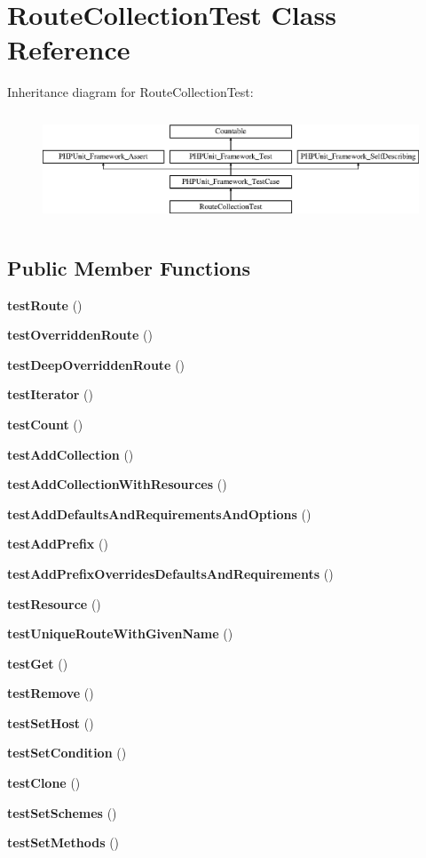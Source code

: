 \section{Route\+Collection\+Test Class Reference}
\label{class_symfony_1_1_component_1_1_routing_1_1_tests_1_1_route_collection_test}
Inheritance diagram for Route\+Collection\+Test\+:\begin{figure}[H]
\begin{center}
\leavevmode
\includegraphics[height=3.303835cm]{class_symfony_1_1_component_1_1_routing_1_1_tests_1_1_route_collection_test}
\end{center}
\end{figure}
\subsection*{Public Member Functions}
\begin{DoxyCompactItemize}
\item 
{\bf test\+Route} ()
\item 
{\bf test\+Overridden\+Route} ()
\item 
{\bf test\+Deep\+Overridden\+Route} ()
\item 
{\bf test\+Iterator} ()
\item 
{\bf test\+Count} ()
\item 
{\bf test\+Add\+Collection} ()
\item 
{\bf test\+Add\+Collection\+With\+Resources} ()
\item 
{\bf test\+Add\+Defaults\+And\+Requirements\+And\+Options} ()
\item 
{\bf test\+Add\+Prefix} ()
\item 
{\bf test\+Add\+Prefix\+Overrides\+Defaults\+And\+Requirements} ()
\item 
{\bf test\+Resource} ()
\item 
{\bf test\+Unique\+Route\+With\+Given\+Name} ()
\item 
{\bf test\+Get} ()
\item 
{\bf test\+Remove} ()
\item 
{\bf test\+Set\+Host} ()
\item 
{\bf test\+Set\+Condition} ()
\item 
{\bf test\+Clone} ()
\item 
{\bf test\+Set\+Schemes} ()
\item 
{\bf test\+Set\+Methods} ()
\end{DoxyCompactItemize}
